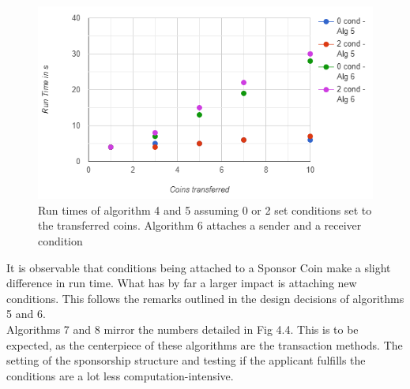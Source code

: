 \begin{figure}[H]
    \centering
    \includegraphics[scale=0.7]{figures/4.4.png}  
    \caption{Run times of algorithm 4 and 5 assuming 0 or 2 set conditions set to the transferred coins. Algorithm 6 attaches a sender and a receiver condition}
    \label{fig:testalgo56}
\end{figure}
It is observable that conditions being attached to a Sponsor Coin make a slight difference in run time. What has by far a larger impact is attaching new conditions. This follows the remarks outlined in the design decisions of algorithms 5 and 6.\\
Algorithms 7 and 8 mirror the numbers detailed in Fig 4.4. This is to be expected, as the centerpiece of these algorithms are the transaction methods. The setting of the sponsorship structure and testing if the applicant fulfills the conditions are a lot less computation-intensive.\\